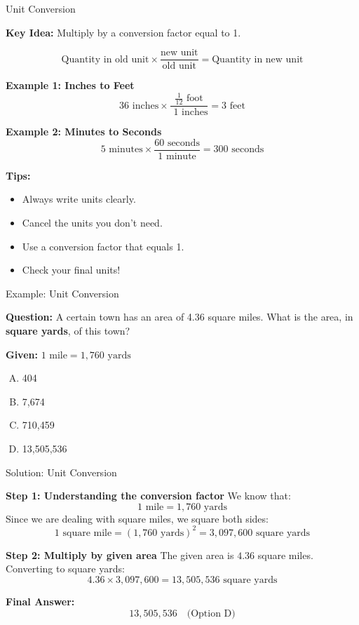 \documentclass{beamer}
\begin{document}
\begin{frame}{Unit Conversion}

\textbf{Key Idea:} Multiply by a conversion factor equal to 1.

\[
\text{Quantity in old unit} \times \frac{\text{new unit}}{\text{old unit}} = \text{Quantity in new unit}
\]

\vspace{0.5em}
\textbf{Example 1: Inches to Feet}
\[
36 \text{ inches} \times \frac{\frac{1}{12} \text{ foot}}{{} \text{ 1 inches}} = 3 \text{ feet}
\]

\vspace{0.5em}
\textbf{Example 2: Minutes to Seconds}
\[
5 \text{ minutes} \times \frac{60 \text{ seconds}}{1 \text{ minute}} = 300 \text{ seconds}
\]

\vspace{1em}
\textbf{Tips:}
\begin{itemize}
    \item Always write units clearly.
    \item Cancel the units you don’t need.
    \item Use a conversion factor that equals 1.
    \item Check your final units!
\end{itemize}

\end{frame}



\begin{frame}{Example: Unit Conversion}

\textbf{Question:} A certain town has an area of 4.36 square miles. What is the area, in \textbf{square yards}, of this town?

\textbf{Given:} \(1 \text{ mile} = 1,760 \text{ yards}\)

\begin{enumerate}[(A)]
    \item 404
    \item 7,674
    \item 710,459
    \item 13,505,536
\end{enumerate}

\end{frame}







\begin{frame}{Solution: Unit Conversion}

\textbf{Step 1: Understanding the conversion factor}
We know that:
\[
1 \text{ mile} = 1,760 \text{ yards}
\]
Since we are dealing with square miles, we square both sides:
\[
1 \text{ square mile} = (1,760 \text{ yards})^2 = 3,097,600 \text{ square yards}
\]

\textbf{Step 2: Multiply by given area}
The given area is \( 4.36 \) square miles. Converting to square yards:
\[
4.36 \times 3,097,600 = 13,505,536 \text{ square yards}
\]

\textbf{Final Answer:}
\[
\boxed{13,505,536} \quad \text{(Option D)}
\]

\end{frame}
\end{document}
